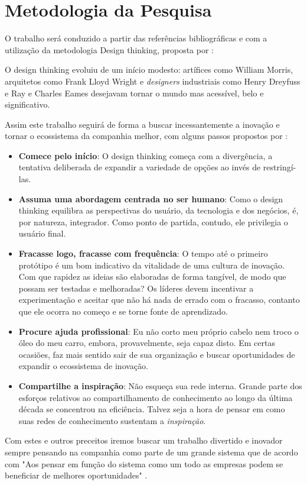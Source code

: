\chapter{Metodologia da Pesquisa}

O trabalho será conduzido a partir das referências bibliográficas e com a utilização da metodologia Design thinking, proposta por :
\begin{citacao}
O design thinking evoluiu de um início modesto: artífices como William Morris, arquitetos como Frank Lloyd Wright e \textit{designers} industriais como Henry Dreyfuss e Ray e Charles Eames desejavam tornar o mundo mas acessível, belo e significativo.
\end{citacao}

Assim este trabalho seguirá de forma a buscar incessantemente a inovação e tornar o ecossistema da companhia melhor, com alguns passos propostos por :

\begin{citacao}
\begin{itemize}
\item \textbf{Comece pelo início}: O design thinking começa com a divergência, a tentativa deliberada de expandir a variedade de opções ao invés de restringí-las.
\item \textbf{Assuma uma abordagem centrada no ser humano}: Como o design thinking equilibra as perspectivas do usuário, da tecnologia e dos negócios, é, por natureza, integrador. Como ponto de partida, contudo, ele privilegia o usuário final.
\item \textbf{Fracasse logo, fracasse com frequência}: O tempo até o primeiro protótipo é um bom indicativo da vitalidade de uma cultura de inovação. Com que rapidez as ideias são elaboradas de forma tangível, de modo que possam ser testadas e melhoradas? Os líderes devem incentivar a experimentação e aceitar que não há nada de errado com o fracasso, contanto que ele ocorra no começo e se torne fonte de aprendizado.
\item \textbf{Procure ajuda profissional}: Eu não corto meu próprio cabelo nem troco o óleo do meu carro, embora, provavelmente, seja capaz disto. Em certas ocasiões, faz mais sentido sair de sua organização e buscar oportunidades de expandir o ecossistema de inovação.
\item \textbf{Compartilhe a inspiração}: Não esqueça sua rede interna. Grande parte dos esforços relativos ao compartilhamento de conhecimento ao longo da última década se concentrou na eficiência. Talvez seja a hora de pensar em como suas redes de conhecimento sustentam a \emph{inspiração}.
\end{itemize}
\end{citacao}
Com estes e outros preceitos iremos buscar um trabalho divertido e inovador sempre pensando na companhia como parte de um grande sistema que de acordo com  "Aos pensar em função do sistema como um todo as empresas podem se beneficiar de melhores oportunidades" .
